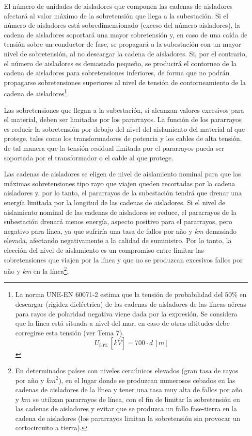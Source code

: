             El número de unidades de aisladores que componen las cadenas de aisladores afectará al valor máximo de la sobretensión que llega a la subestación. Si el número de aisladores está sobredimensionado (exceso del número aisladores), la cadena de aisladores soportará una mayor sobretensión y, en caso de una caída de tensión sobre un conductor de fase, se propagará a la subestación con un mayor nivel de sobretensión, al no descargar la cadena de aisladores. Si, por el contrario, el número de aisladores es demasiado pequeño, se producirá el contorneo de la cadena de aisladores para sobretensiones inferiores, de forma que no podrán propagarse sobretensiones superiores al nivel de tensión de contorneamiento de la cadena de aisladores\footnote{La norma UNE-EN 60071-2 estima que la tensión de probabilidad del $50\!$\% en descargar (rigidez dieléctrica) de las cadenas de aisladores de las líneas aéreas para rayos de polaridad negativa viene dada por la expresión. Se considera que la línea está situada a nivel del mar, en caso de otras altitudes debe corregirse esta tensión (ver Tema 7). $$U_{50\!\text{\%}}\,[\textit{k}\!\mathit{\hat{V}}] = 700\cdot d\,[\textit{m}]$$}.\newline

            Las sobretensiones que llegan a la subestación, si alcanzan valores excesivos para el material, deben ser limitadas por los pararrayos. La función de los pararrayos es reducir la sobretensión por debajo del nivel del aislamiento del material al que protege, tales como los transformadores de potencia y los cables de alta tensión, de tal manera que la tensión residual limitada por el pararrayos pueda ser soportada por el transformador o el cable al que protege.\newline

            Las cadenas de aisladores se eligen de nivel de aislamiento nominal para que las máximas sobretensiones tipo rayo que viajen queden recortadas por la cadena aisladores y, por lo tanto, el pararrayos de la subestación tendrá que drenar una energía limitada por la longitud de las cadenas de aisladores. Si el nivel de aislamiento nominal de las cadenas de aisladores se reduce, el pararrayos de la subestación drenará menos energía, aspecto positivo para el pararrayos, pero negativo para línea, ya que sufriría una tasa de fallos por año y \textit{km} demasiado elevada, afectando negativamente a la calidad de suministro. Por lo tanto, la elección del nivel de aislamiento es un compromiso entre limitar las sobretensiones que viajen por la línea y que no se produzcan excesivos fallos por año y \textit{km} en la línea\footnote{En determinados países con niveles ceraúnicos elevados (gran tasa de rayos por año y $\textit{km}^2$), en el lugar donde se produzcan numerosos cebados en las cadenas de aisladores de la línea y tener una tasa muy alta de fallos por año y $\textit{km}$ se utilizan pararrayos de línea, con el fin de limitar la sobretensión en las cadenas de aisladores y evitar que se produzca un fallo fase-tierra en la cadena de aisladores (los pararrayos limitan la sobretensión sin provocar un cortocircuito a tierra).}.\newline

